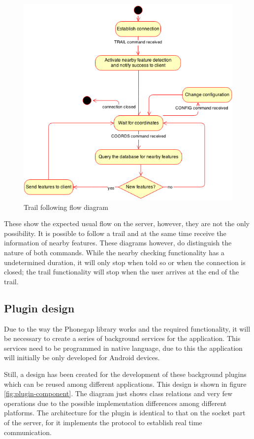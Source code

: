 \begin{figure}[ht]
  \centering
  \includegraphics[width=.7\textwidth]{fig/protocol1}
  \caption{Trail following flow diagram}
  \label{fig:protocol2}
\end{figure} 

These show the expected usual flow on the server, however, they are not the only possibility. It is possible to follow a trail and at the same time receive the information of nearby features. These diagrams however, do distinguish the nature of both commands. While the nearby checking functionality has a undetermined duration, it will only stop when told so or when the connection is closed; the trail functionality will stop when the user arrives at the end of the trail.

\subsection{Plugin design}

Due to the way the Phonegap library works and the required functionality, it will be necessary to create a series of background services for the application. This services need to be programmed in native language, due to this the application will initially be only developed for Android devices.

Still, a design has been created for the development of these background plugins which can be reused among different applications. This design is shown in figure \ref{fig:plugin-component}. The diagram just shows class relations and very few operations due to the possible implementation differences among different platforms. The architecture for the plugin is identical to that on the socket part of the server, for it implements the protocol to establish real time communication.

